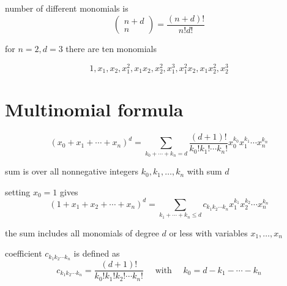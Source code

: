 \begin{theorem}
    number of different monomials is
\begin{equation}
\left(\begin{array}{c}
n+d \\
n
\end{array}\right)=\frac{(n+d) !}{n ! d !}
\end{equation}
\end{theorem}

\begin{example}
    for $n=2, d=3$ there are ten monomials

\begin{equation}1,  x_{1},  x_{2},  x_{1}^{2},  x_{1} x_{2},  x_{2}^{2},  x_{1}^{3},  x_{1}^{2} x_{2},  x_{1} x_{2}^{2},  x_{2}^{3}\end{equation}
\end{example}


\section{Multinomial formula}

\begin{theorem}
    \begin{equation}
\left(x_{0}+x_{1}+\cdots+x_{n}\right)^{d}=\sum_{k_{0}+\cdots+k_{n}=d} \frac{(d+1) !}{k_{0} ! k_{1} ! \cdots k_{n} !} x_{0}^{k_{0}} x_{1}^{k_{1}} \cdots x_{n}^{k_{n}}
\end{equation}

sum is over all nonnegative integers $k_{0}, k_{1}, \ldots, k_{n}$ with sum $d$
\end{theorem}

\begin{corollary}
    setting $x_{0}=1$ gives
\begin{equation}
\left(1+x_{1}+x_{2}+\cdots+x_{n}\right)^{d}=\sum_{k_{1}+\cdots+k_{n} \leq d} c_{k_{1} k_{2} \cdots k_{n}} x_{1}^{k_{1}} x_{2}^{k_{2}} \cdots x_{n}^{k_{n}}
\end{equation}
\end{corollary}

the sum includes all monomials of degree $d$ or less with variables $x_{1}, \ldots, x_{n}$


\begin{definition}
    coefficient $c_{k_{1} k_{2} \cdots k_{n}}$ is defined as
\begin{equation}
c_{k_{1} k_{2} \cdots k_{n}}=\frac{(d+1) !}{k_{0} ! k_{1} ! k_{2} ! \cdots k_{n} !} \quad \text { with } \quad k_{0}=d-k_{1}-\cdots-k_{n}
\end{equation}
\end{definition}




